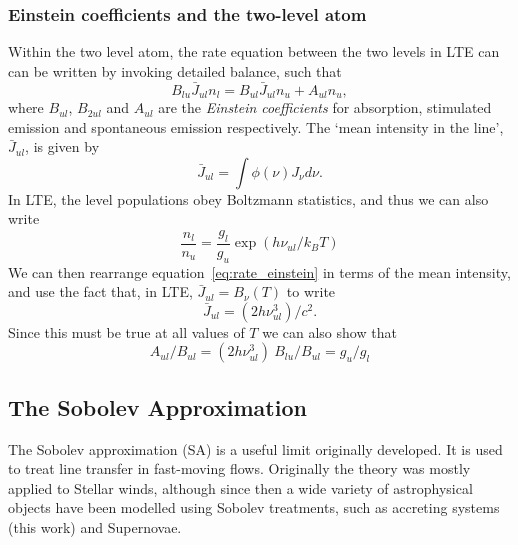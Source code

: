 \subsubsection{Einstein coefficients and the two-level atom}

Within the two level atom, the rate equation between the two levels in LTE can
can be written by invoking detailed balance, such that 
\begin{equation}
B_{lu} \bar{J}_{ul} n_l = B_{ul} \bar{J}_{ul} n_u + A_{ul} n_u,
\label{eq:rate_einstein}
\end{equation}
where $B_{ul}$, $B_{2ul}$ and $A_{ul}$ are the {\em Einstein coefficients}
for absorption, stimulated emission and spontaneous emission respectively.
The `mean intensity in the line', $\bar{J}_{ul}$, is given by
\begin{equation}
\bar{J}_{ul} = \int \phi(\nu) J_\nu d\nu.
\label{eq:jbar}
\end{equation}
In LTE, the level populations obey Boltzmann statistics, and thus we can also
write
\begin{equation}
\frac{n_l}{n_u} = \frac{g_l}{g_u} \exp (h \nu_{ul} / k_B T)
\end{equation}
We can then rearrange equation~\ref{eq:rate_einstein} in terms of the mean intensity,
and use the fact that, in LTE, $\bar{J}_{ul} = B_\nu (T)$ to write
\begin{equation}
\bar{J}_{ul} = (2 h \nu_{ul}^3) / c^2.
\end{equation}
Since this must be true at all values of $T$ we can also show that 
\begin{equation}
A_{ul} / B_{ul} = (2 h \nu_{ul}^3)~B_{lu} / B_{ul} = g_u / g_l
\end{equation}





\subsection{The Sobolev Approximation}
\label{sec:sobolev}
The Sobolev approximation (SA) is a useful limit originally developed.
It is used to treat line transfer in fast-moving flows. Originally 
the theory was mostly applied to Stellar winds, although since then
a wide variety of astrophysical objects have been modelled using Sobolev treatments,
such as accreting systems (this work) and Supernovae.

